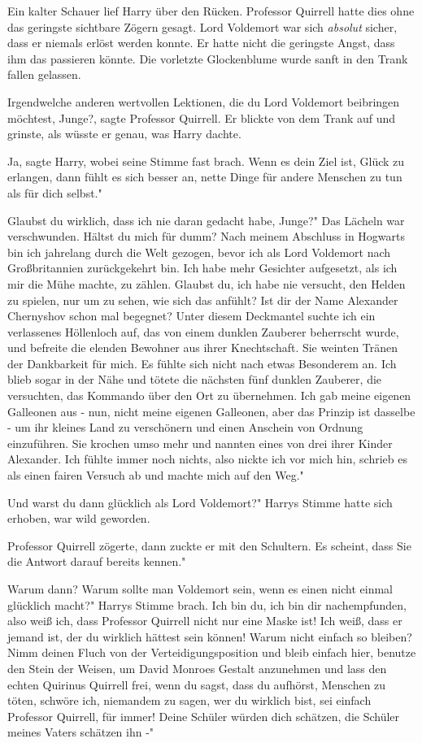 Ein kalter Schauer lief Harry über den Rücken. Professor Quirrell hatte dies
ohne das geringste sichtbare Zögern gesagt. Lord Voldemort war sich
\emph{absolut} sicher, dass er niemals erlöst werden konnte. Er hatte nicht die
geringste Angst, dass ihm das passieren könnte. Die vorletzte Glockenblume wurde
sanft in den Trank fallen gelassen.

\glqq{}Irgendwelche anderen wertvollen Lektionen, die du Lord Voldemort
beibringen möchtest, Junge?\grqq{}, sagte Professor Quirrell. Er blickte von dem
Trank auf und grinste, als wüsste er genau, was Harry dachte.

\glqq{}Ja\grqq{}, sagte Harry, wobei seine Stimme fast brach. \glqq{}Wenn es dein
Ziel ist, Glück zu erlangen, dann fühlt es sich besser an, nette Dinge für
andere Menschen zu tun als für dich selbst."

\glqq{}Glaubst du wirklich, dass ich nie daran gedacht habe, Junge?" Das Lächeln
war verschwunden. \glqq{}Hältst du mich für dumm? Nach meinem Abschluss in
Hogwarts bin ich jahrelang durch die Welt gezogen, bevor ich als Lord Voldemort
nach Großbritannien zurückgekehrt bin. Ich habe mehr Gesichter aufgesetzt, als
ich mir die Mühe machte, zu zählen. Glaubst du, ich habe nie versucht, den
Helden zu spielen, nur um zu sehen, wie sich das anfühlt? Ist dir der Name
Alexander Chernyshov schon mal begegnet? Unter diesem Deckmantel suchte ich ein
verlassenes Höllenloch auf, das von einem dunklen Zauberer beherrscht wurde, und
befreite die elenden Bewohner aus ihrer Knechtschaft. Sie weinten Tränen der
Dankbarkeit für mich. Es fühlte sich nicht nach etwas Besonderem an. Ich blieb
sogar in der Nähe und tötete die nächsten fünf dunklen Zauberer, die versuchten,
das Kommando über den Ort zu übernehmen. Ich gab meine eigenen Galleonen aus -
nun, nicht meine eigenen Galleonen, aber das Prinzip ist dasselbe - um ihr
kleines Land zu verschönern und einen Anschein von Ordnung einzuführen. Sie
krochen umso mehr und nannten eines von drei ihrer Kinder Alexander. Ich fühlte
immer noch nichts, also nickte ich vor mich hin, schrieb es als einen fairen
Versuch ab und machte mich auf den Weg."

Und warst du dann glücklich als Lord Voldemort?" Harrys Stimme hatte sich
erhoben, war wild geworden.

Professor Quirrell zögerte, dann zuckte er mit den Schultern. \glqq{}Es scheint,
dass Sie die Antwort darauf bereits kennen."

\glqq{}Warum dann? Warum sollte man Voldemort sein, wenn es einen nicht einmal
glücklich macht?" Harrys Stimme brach. \glqq{}Ich bin du, ich bin dir
nachempfunden, also weiß ich, dass Professor Quirrell nicht nur eine Maske ist!
Ich weiß, dass er jemand ist, der du wirklich hättest sein können! Warum nicht
einfach so bleiben? Nimm deinen Fluch von der Verteidigungsposition und bleib
einfach hier, benutze den Stein der Weisen, um David Monroes Gestalt anzunehmen
und lass den echten Quirinus Quirrell frei, wenn du sagst, dass du aufhörst,
Menschen zu töten, schwöre ich, niemandem zu sagen, wer du wirklich bist, sei
einfach Professor Quirrell, für immer! Deine Schüler würden dich schätzen, die
Schüler meines Vaters schätzen ihn -"

